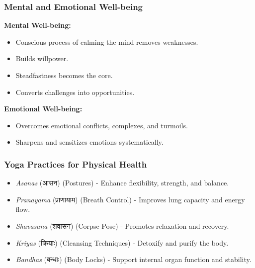 \begin{frame}[fragile]\frametitle{Mental and Emotional Well-being}
    \textbf{Mental Well-being:}
    \begin{itemize}
        \item Conscious process of calming the mind removes weaknesses.
        \item Builds willpower.
        \item Steadfastness becomes the core.
        \item Converts challenges into opportunities.
    \end{itemize}

    
    \textbf{Emotional Well-being:}
    \begin{itemize}
        \item Overcomes emotional conflicts, complexes, and turmoils.
        \item Sharpens and sensitizes emotions systematically.
    \end{itemize}
\end{frame}




\begin{frame}[fragile]\frametitle{Yoga Practices for Physical Health}

      \begin{itemize}
        \item \textit{Asanas} (आसन) (Postures) - Enhance flexibility, strength, and balance.
        \item \textit{Pranayama} (प्राणायाम) (Breath Control) - Improves lung capacity and energy flow.
        \item \textit{Shavasana} (शवासन) (Corpse Pose) - Promotes relaxation and recovery.
        \item \textit{Kriyas} (क्रियाः) (Cleansing Techniques) - Detoxify and purify the body.
        \item \textit{Bandhas} (बन्धाः) (Body Locks) - Support internal organ function and stability.
      \end{itemize}

\end{frame}

